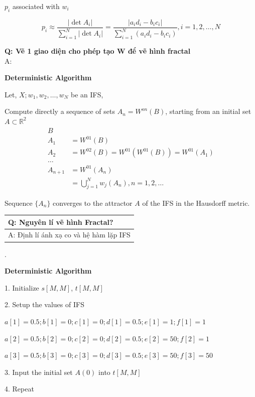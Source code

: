 $p_i$ associated with $w_i$

\begin{equation*}
    p_i \approx \frac{|\det A_i|}{\sum_{i=1}^N |\det A_i|} = \frac{|a_i d_i - b_i c_i|}{\sum_{i=1}^N (a_i d_i - b_i c_i)}, i = 1, 2, \ldots, N
\end{equation*}

\textbf{Q: Vẽ 1 giao diện cho phép tạo W để vẽ hình fractal}\\
A:

\textbf{Deterministic Algorithm}

Let, ${X; w_1, w_2, \ldots, w_N}$ be an IFS,

Compute directly a sequence of sets $A_n = W^{on}(B)$, starting from an initial set $A \subset \mathbb{R}^2$
\begin{align*}
    B&\\
    A_1 &= W^{01}(B)\\
    A_2 &= W^{02}(B) = W^{01}(W^{01}(B)) = W^{01}(A_1)\\
    \ldots\\
    A_{n+1} &= W^{01}(A_n)\\
    &= \bigcup_{j=1}^N w_j(A_n), n =1, 2, \ldots
\end{align*}

Sequence $\{A_n\}$ converges to the attractor $A$ of the IFS in the Hausdorff metric.

\begin{table}[H]
    \centering
    \begin{tabular}{|l|}
    \hline
    \textbf{Q: Nguyên lí vẽ hình Fractal?}  \\ \hline
    A: Định lí ánh xạ co và hệ hàm lặp IFS  \\ \hline
    \end{tabular}
\end{table}.

\pagebreak
\textbf{Deterministic Algorithm}

1. Initialize $s[M,M]$, $t[M,M]$

2. Setup the values of IFS

$a[1]=0.5; b[1]=0; c[1]=0; d[1]=0.5; e[1]=1; f[1]=1$

$a[2]=0.5; b[2]=0; c[2]=0; d[2]=0.5; e[2]=50; f[2]=1$

$a[3]=0.5; b[3]=0; c[3]=0; d[3]=0.5; e[3]=50; f[3]=50$

3. Input the initial set $A(0)$ into $t[M,M]$

4. Repeat

